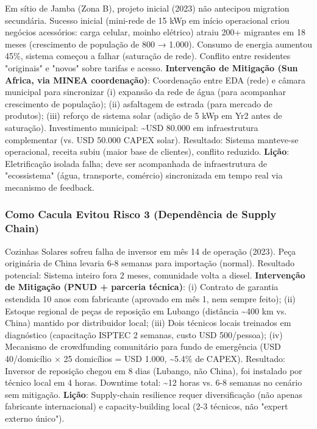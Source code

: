 \documentclass[12pt, a4paper]{article}
\begin{document}
Em sítio de Jamba (Zona B), projeto inicial (2023) não antecipou migration secundária. Sucesso inicial (mini-rede de 15 kWp em início operacional criou negócios acessórios: carga celular, moinho elétrico) atraiu 200+ migrantes em 18 meses (crescimento de população de 800 → 1.000). Consumo de energia aumentou 45\%, sistema começou a falhar (saturação de rede). Conflito entre residentes "originais" e "novos" sobre tarifas e acesso.
\textbf{Intervenção de Mitigação (Sun Africa, via MINEA coordenação)}: Coordenação entre EDA (rede) e câmara municipal para sincronizar (i) expansão da rede de água (para acompanhar crescimento de população); (ii) asfaltagem de estrada (para mercado de produtos); (iii) reforço de sistema solar (adição de 5 kWp em Yr2 antes de saturação). Investimento municipal: \textasciitilde{}USD 80.000 em infraestrutura complementar (vs. USD 50.000 CAPEX solar). Resultado: Sistema manteve-se operacional, receita subiu (maior base de clientes), conflito reduzido.
\textbf{Lição}: Eletrificação isolada falha; deve ser acompanhada de infraestrutura de "ecossistema" (água, transporte, comércio) sincronizada em tempo real via mecanismo de feedback.

\subsubsection*{Como Cacula Evitou Risco 3 (Dependência de Supply Chain)}

Cozinhas Solares sofreu falha de inversor em mês 14 de operação (2023). Peça originária de China levaria 6-8 semanas para importação (normal). Resultado potencial: Sistema inteiro fora 2 meses, comunidade volta a diesel.
\textbf{Intervenção de Mitigação (PNUD + parceria técnica)}: (i) Contrato de garantia estendida 10 anos com fabricante (aprovado em mês 1, nem sempre feito); (ii) Estoque regional de peças de reposição em Lubango (distância \textasciitilde{}400 km vs. China) mantido por distribuidor local; (iii) Dois técnicos locais treinados em diagnóstico (capacitação ISPTEC 2 semanas, custo USD 500/pessoa); (iv) Mecanismo de crowdfunding comunitário para fundo de emergência (USD 40/domicílio × 25 domicílios = USD 1.000, \textasciitilde{}5.4\% de CAPEX). Resultado: Inversor de reposição chegou em 8 dias (Lubango, não China), foi instalado por técnico local em 4 horas. Downtime total: \textasciitilde{}12 horas vs. 6-8 semanas no cenário sem mitigação.
\textbf{Lição}: Supply-chain resilience requer diversificação (não apenas fabricante internacional) e capacity-building local (2-3 técnicos, não "expert externo único").
\end{document}
